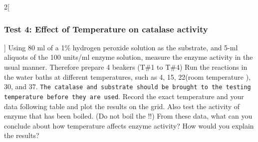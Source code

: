 \vspace{1cm}
\begin{multicols}{2}[\subsubsection{Test 4: Effect of Temperature on catalase activity}]
Using 80 ml of a 1\% hydrogen peroxide solution as the substrate, and 5-ml aliquots of the 100 units/ml enzyme solution, measure the enzyme activity in the usual manner. Therefore prepare 4 beakers (T\#1 to T\#4) Run the reactions in the water baths at different temperatures, such as 4\degreecelsius, 15\degreecelsius,  22\degreecelsius (room temperature ), 30\degreecelsius, and 37\degreecelsius. \texttt{The catalase and substrate should be brought to the testing temperature before they are used}. Record the exact temperature and your data following table and plot the results on the grid. Also test the activity of enzyme that has been boiled. (Do not boil the !!) From these data, what can you conclude about how temperature affects enzyme activity? How would you explain the results?
\end{multicols}


